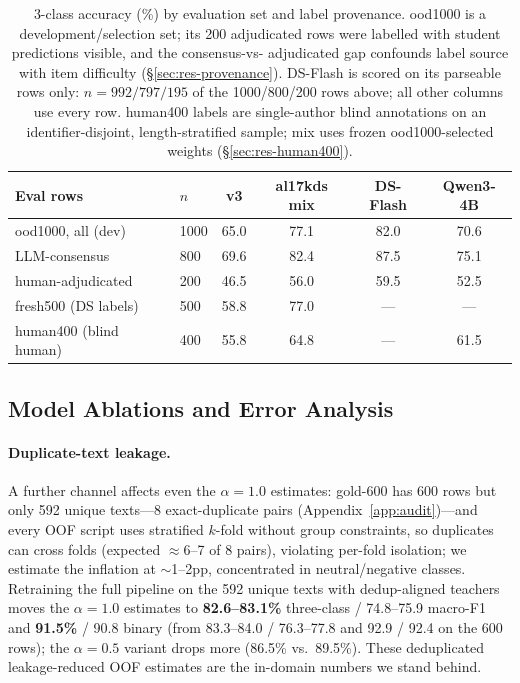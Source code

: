 \begin{table}[t]
\centering\scriptsize
\setlength{\tabcolsep}{2.5pt}
\begin{tabular}{llcccc}
\toprule
Eval rows & $n$ & v3 & al17kds mix & DS-Flash & Qwen3-4B \\
\midrule
ood1000, all (dev) & 1000 & 65.0 & 77.1 & 82.0 & 70.6 \\
\quad LLM-consensus & 800 & 69.6 & 82.4 & 87.5 & 75.1 \\
\quad human-adjudicated & 200 & 46.5 & 56.0 & 59.5 & 52.5 \\
\midrule
fresh500 (DS labels) & 500 & 58.8 & 77.0 & --- & --- \\
\midrule
human400 (blind human) & 400 & 55.8 & 64.8 & --- & 61.5 \\
\bottomrule
\end{tabular}
\caption{3-class accuracy (\%) by evaluation set and label provenance.
ood1000 is a development/selection set; its 200 adjudicated rows were
labelled with student predictions visible, and the consensus-vs-
adjudicated gap confounds label source with item difficulty
(\S\ref{sec:res-provenance}). DS-Flash is scored on its parseable rows
only: $n{=}992/797/195$ of the 1000/800/200 rows above; all other
columns use every row. human400 labels are single-author blind
annotations on an identifier-disjoint, length-stratified sample; mix
uses frozen ood1000-selected weights (\S\ref{sec:res-human400}).}
\label{tab:ood-results}
\end{table}

\subsection{Model Ablations and Error Analysis}
\label{sec:res-ablations}

\paragraph{Duplicate-text leakage.} A further channel affects even the
$\alpha{=}1.0$ estimates: gold-600 has 600 rows but only 592 unique
texts---8 exact-duplicate pairs (Appendix~\ref{app:audit})---and every
OOF script uses stratified $k$-fold without group constraints, so
duplicates can cross folds (expected $\approx$6--7 of 8 pairs),
violating per-fold isolation; we estimate the inflation at $\sim$1--2pp,
concentrated in neutral/negative classes. Retraining the full pipeline
on the 592 unique texts with dedup-aligned teachers moves the
$\alpha{=}1.0$ estimates to \textbf{82.6--83.1\%} three-class /
74.8--75.9 macro-F1 and \textbf{91.5\%} / 90.8 binary (from 83.3--84.0
/ 76.3--77.8 and 92.9 / 92.4 on the 600 rows); the $\alpha{=}0.5$
variant drops more (86.5\% vs.\ 89.5\%). These deduplicated
leakage-reduced OOF estimates are the in-domain numbers we stand behind.

